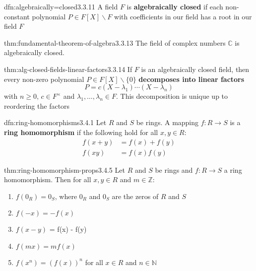 \documentclass[landscape, 8pt]{extarticle}
\begin{document}
\begin{multicols}{3}
\begin{dfn}{dfn:algebraically=closed}{3.3.11}
    A field $F$ is \textbf{algebraically closed} if each non-constant polynomial $P\in F[X]\backslash F$ with coefficients in our field has a root in our field $F$
\end{dfn}

\begin{thm}{thm:fundamental-theorem-of-algebra}{3.3.13}
    The field of complex numbers $\mathbb{C}$ is algebraically closed.
\end{thm}

\begin{thm}{thm:alg-closed-fields-linear-factors}{3.3.14}
    If $F$ is an algebraically closed field, then every non-zero polynomial $P\in F[X]\backslash \{0\}$ \textbf{decomposes into linear factors}
    \[P = c(X - \lambda_{1}) \cdots (X - \lambda_{n})\]
    with $n\ge 0,\, c\in F^{\times}$ and $\lambda_{1},\dots,\lambda_{n}\in F$. This decomposition is unique up to reordering the factors
\end{thm}

\begin{dfn}{dfn:ring-homomorphisms}{3.4.1}
    Let $R$ and $S$ be rings. A mapping $f : R \to S$ is a \textbf{ring homomorphism} if the following hold for all $x, y\in R$:
    \begin{align*}
        f (x + y) &= f(x) + f(y)\\
        f(xy) &= f(x)f(y)
    \end{align*}
\end{dfn}

\begin{thm}{thm:ring-homomorphism-props}{3.4.5}
    Let $R$ and $S$ be rings and $f : R \to S$ a ring homomorphism. Then for all $x,y\in R$ and $m\in \mathbb{Z}$:
    \begin{enumerate}
        \setlength\itemsep{0em}
        \item $f(0_{R}) = 0_{S}$, where $0_{R}$ and $0_{S}$ are the zeros of $R$ and $S$
        \item $f(-x) = -f(x)$
        \item $f(x - y)$ = f(x) - f(y)
        \item $f(mx) = mf(x)$
        \item $f(x^{n}) = (f(x))^{n}$ for all $x\in R$ and $n\in \mathbb{N}$
    \end{enumerate}
\end{thm}


\end{multicols}
\end{document}
